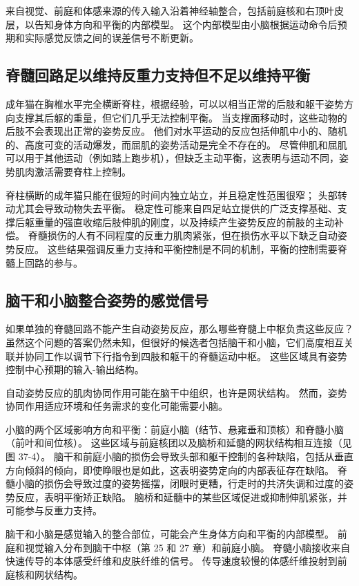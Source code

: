 来自视觉、前庭和体感来源的传入输入沿着神经轴整合，包括前庭核和右顶叶皮层，以告知身体方向和平衡的内部模型。 这个内部模型由小脑根据运动命令后预期和实际感觉反馈之间的误差信号不断更新。

\subsection{脊髓回路足以维持反重力支持但不足以维持平衡}
成年猫在胸椎水平完全横断脊柱，根据经验，可以以相当正常的后肢和躯干姿势方向支撑其后躯的重量，但它们几乎无法控制平衡。 当支撑面移动时，这些动物的后肢不会表现出正常的姿势反应。 他们对水平运动的反应包括伸肌中小的、随机的、高度可变的活动爆发，而屈肌的姿势活动是完全不存在的。 尽管伸肌和屈肌可以用于其他运动（例如踏上跑步机），但缺乏主动平衡，这表明与运动不同，姿势肌肉激活需要脊柱上控制。

脊柱横断的成年猫只能在很短的时间内独立站立，并且稳定性范围很窄； 头部转动尤其会导致动物失去平衡。 稳定性可能来自四足站立提供的广泛支撑基础、支撑后躯重量的强直收缩后肢伸肌的刚度，以及持续产生姿势反应的前肢的主动补偿。 脊髓损伤的人有不同程度的反重力肌肉紧张，但在损伤水平以下缺乏自动姿势反应。 这些结果强调反重力支持和平衡控制是不同的机制，平衡的控制需要脊髓上回路的参与。

\subsection{脑干和小脑整合姿势的感觉信号}

如果单独的脊髓回路不能产生自动姿势反应，那么哪些脊髓上中枢负责这些反应？ 虽然这个问题的答案仍然未知，但很好的候选者包括脑干和小脑，它们高度相互关联并协同工作以调节下行指令到四肢和躯干的脊髓运动中枢。 这些区域具有姿势控制中心预期的输入-输出结构。

自动姿势反应的肌肉协同作用可能在脑干中组织，也许是网状结构。 然而，姿势协同作用适应环境和任务需求的变化可能需要小脑。

小脑的两个区域影响方向和平衡：前庭小脑（结节、悬雍垂和顶核）和脊髓小脑（前叶和间位核）。 这些区域与前庭核团以及脑桥和延髓的网状结构相互连接（见图 37-4）。 脑干和前庭小脑的损伤会导致头部和躯干控制的各种缺陷，包括从垂直方向倾斜的倾向，即使睁眼也是如此，这表明姿势定向的内部表征存在缺陷。 脊髓小脑的损伤会导致过度的姿势摇摆，闭眼时更糟，行走时的共济失调和过度的姿势反应，表明平衡矫正缺陷。 脑桥和延髓中的某些区域促进或抑制伸肌紧张，并可能参与反重力支持。

脑干和小脑是感觉输入的整合部位，可能会产生身体方向和平衡的内部模型。 前庭和视觉输入分布到脑干中枢（第 25 和 27 章）和前庭小脑。 脊髓小脑接收来自快速传导的本体感受纤维和皮肤纤维的信号。 传导速度较慢的体感纤维投射到前庭核和网状结构。


